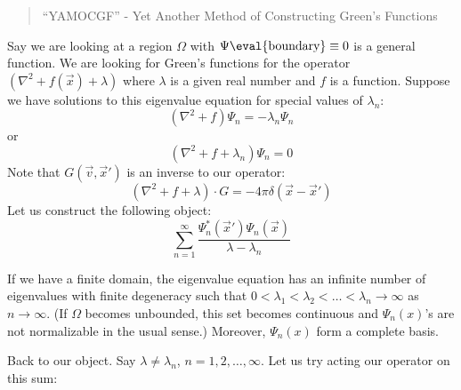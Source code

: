 \documentclass[a4paper,twoside,master.tex]{subfiles}
\begin{document}
\begin{quote}
    ``YAMOCGF'' - Yet Another Method of Constructing Green's Functions
\end{quote}
Say we are looking at a region $\Omega$ with $\Psi\eval{\text{boundary}}\equiv 0$ is a general function. We are looking for Green's functions for the operator $(\nabla^2 + f(\vec{x}) + \lambda )$ where $\lambda$ is a given real number and $f$ is a function. Suppose we have solutions to this eigenvalue equation for special values of $\lambda_n$:
\begin{equation}
    (\nabla^2 + f)\Psi_n = -\lambda_n\Psi_n
\end{equation}
or
\begin{equation}
    (\nabla^2 + f + \lambda_n)\Psi_n = 0
\end{equation}
Note that $G(\vec{v},\vec{x}')$ is an inverse to our operator:
\begin{equation}
    (\nabla^2 + f + \lambda)\cdot G = -4\pi\delta(\vec{x}-\vec{x}')
\end{equation}
Let us construct the following object:
\begin{equation}
    \sum_{n=1}^{\infty} \frac{\Psi_n^*(\vec{x}')\Psi_n(\vec{x})}{\lambda-\lambda_n}
\end{equation}
\begin{theorem}
    If we have a finite domain, the eigenvalue equation has an infinite number of eigenvalues with finite degeneracy such that $0<\lambda_1 < \lambda_2 < \ldots < \lambda_n\to\infty$ as $n\to\infty$. (If $\Omega$ becomes unbounded, this set becomes continuous and $\Psi_n(x)$'s are not normalizable in the usual sense.)
    Moreover, $\Psi_n(x)$ form a complete basis.
\end{theorem}

Back to our object. Say $\lambda\neq \lambda_n$, $n=1,2,\ldots,\infty$. Let us try acting our operator on this sum:
\end{document}
